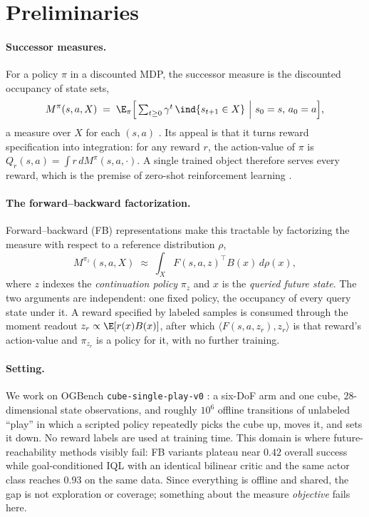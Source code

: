 \section{Preliminaries}
\label{sec:prelim}

\paragraph{Successor measures.}
For a policy $\pi$ in a discounted MDP, the successor measure is the discounted
occupancy of state sets,
\begin{equation}
\label{eq:sm}
M^{\pi}(s,a,X) \;=\; \E_{\pi}\Big[\textstyle\sum_{t\ge 0}\gamma^{t}\,
\ind{s_{t+1}\in X}\ \Big|\ s_{0}=s,\,a_{0}=a\Big],
\end{equation}
a measure over $X$ for each $(s,a)$ \citep{dayan1993improving,blier2021learning}.
Its appeal is that it turns reward specification into integration: for any reward
$r$, the action-value of $\pi$ is $Q_r(s,a)=\int r\,dM^{\pi}(s,a,\cdot)$. A single
trained object therefore serves every reward, which is the premise of zero-shot
reinforcement learning \citep{touati2021learning,touati2023does}.

\paragraph{The forward--backward factorization.}
Forward--backward (FB) representations make this tractable by factorizing the
measure with respect to a reference distribution $\rho$,
\begin{equation}
\label{eq:fb}
M^{\pi_z}(s,a,X) \;\approx\; \int_X F(s,a,z)^{\top}B(x)\,d\rho(x),
\end{equation}
where $z$ indexes the \emph{continuation policy} $\pi_z$ and $x$ is the
\emph{queried future state}. The two arguments are independent: one fixed policy,
the occupancy of every query state under it. A reward specified by labeled samples
is consumed through the moment readout $z_r \propto \E[r(x)B(x)]$, after which
$\langle F(s,a,z_r), z_r\rangle$ is that reward's action-value and $\pi_{z_r}$ is a
policy for it, with no further training.

\paragraph{Setting.}
We work on OGBench \texttt{cube-single-play-v0} \citep{park2024ogbench}: a
six-DoF arm and one cube, $28$-dimensional state observations, and roughly $10^{6}$
offline transitions of unlabeled ``play'' in which a scripted policy repeatedly
picks the cube up, moves it, and sets it down. No reward labels are used at
training time. This domain is where future-reachability methods visibly fail:
FB variants plateau near $0.42$ overall success while goal-conditioned IQL
\citep{kostrikov2021offline} with an identical bilinear critic and the same actor
class reaches $0.93$ on the same data. Since everything is offline and shared, the
gap is not exploration or coverage; something about the measure \emph{objective}
fails here.

